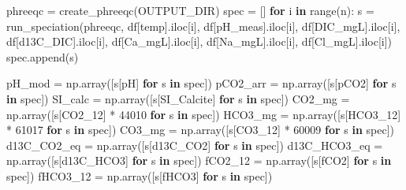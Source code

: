 \documentclass[
  letterpaper,
  DIV=11,
  numbers=noendperiod]{scrartcl}
\newenvironment{Shaded}{\begin{snugshade}}{\end{snugshade}}
\newcommand{\BuiltInTok}[1]{\textcolor[rgb]{0.00,0.23,0.31}{#1}}
\newcommand{\ControlFlowTok}[1]{\textcolor[rgb]{0.00,0.23,0.31}{\textbf{#1}}}
\newcommand{\DecValTok}[1]{\textcolor[rgb]{0.68,0.00,0.00}{#1}}
\newcommand{\KeywordTok}[1]{\textcolor[rgb]{0.00,0.23,0.31}{\textbf{#1}}}
\newcommand{\NormalTok}[1]{\textcolor[rgb]{0.00,0.23,0.31}{#1}}
\newcommand{\OperatorTok}[1]{\textcolor[rgb]{0.37,0.37,0.37}{#1}}
\newcommand{\StringTok}[1]{\textcolor[rgb]{0.13,0.47,0.30}{#1}}
\begin{document}
\begin{Shaded}
\begin{Highlighting}[]
\NormalTok{phreeqc }\OperatorTok{=}\NormalTok{ create\_phreeqc(OUTPUT\_DIR)}
\NormalTok{spec }\OperatorTok{=}\NormalTok{ []}
\ControlFlowTok{for}\NormalTok{ i }\KeywordTok{in} \BuiltInTok{range}\NormalTok{(n):}
\NormalTok{    s }\OperatorTok{=}\NormalTok{ run\_speciation(phreeqc, df[}\StringTok{\textquotesingle{}temp\textquotesingle{}}\NormalTok{].iloc[i], df[}\StringTok{\textquotesingle{}pH\_meas\textquotesingle{}}\NormalTok{].iloc[i],}
\NormalTok{                       df[}\StringTok{\textquotesingle{}DIC\_mgL\textquotesingle{}}\NormalTok{].iloc[i], df[}\StringTok{\textquotesingle{}d13C\_DIC\textquotesingle{}}\NormalTok{].iloc[i],}
\NormalTok{                       df[}\StringTok{\textquotesingle{}Ca\_mgL\textquotesingle{}}\NormalTok{].iloc[i], df[}\StringTok{\textquotesingle{}Na\_mgL\textquotesingle{}}\NormalTok{].iloc[i], df[}\StringTok{\textquotesingle{}Cl\_mgL\textquotesingle{}}\NormalTok{].iloc[i])}
\NormalTok{    spec.append(s)}

\NormalTok{pH\_mod       }\OperatorTok{=}\NormalTok{ np.array([s[}\StringTok{\textquotesingle{}pH\textquotesingle{}}\NormalTok{] }\ControlFlowTok{for}\NormalTok{ s }\KeywordTok{in}\NormalTok{ spec])}
\NormalTok{pCO2\_arr     }\OperatorTok{=}\NormalTok{ np.array([s[}\StringTok{\textquotesingle{}pCO2\textquotesingle{}}\NormalTok{] }\ControlFlowTok{for}\NormalTok{ s }\KeywordTok{in}\NormalTok{ spec])}
\NormalTok{SI\_calc      }\OperatorTok{=}\NormalTok{ np.array([s[}\StringTok{\textquotesingle{}SI\_Calcite\textquotesingle{}}\NormalTok{] }\ControlFlowTok{for}\NormalTok{ s }\KeywordTok{in}\NormalTok{ spec])}
\NormalTok{CO2\_mg       }\OperatorTok{=}\NormalTok{ np.array([s[}\StringTok{\textquotesingle{}CO2\_12\textquotesingle{}}\NormalTok{] }\OperatorTok{*} \DecValTok{44010} \ControlFlowTok{for}\NormalTok{ s }\KeywordTok{in}\NormalTok{ spec])}
\NormalTok{HCO3\_mg      }\OperatorTok{=}\NormalTok{ np.array([s[}\StringTok{\textquotesingle{}HCO3\_12\textquotesingle{}}\NormalTok{] }\OperatorTok{*} \DecValTok{61017} \ControlFlowTok{for}\NormalTok{ s }\KeywordTok{in}\NormalTok{ spec])}
\NormalTok{CO3\_mg       }\OperatorTok{=}\NormalTok{ np.array([s[}\StringTok{\textquotesingle{}CO3\_12\textquotesingle{}}\NormalTok{] }\OperatorTok{*} \DecValTok{60009} \ControlFlowTok{for}\NormalTok{ s }\KeywordTok{in}\NormalTok{ spec])}
\NormalTok{d13C\_CO2\_eq  }\OperatorTok{=}\NormalTok{ np.array([s[}\StringTok{\textquotesingle{}d13C\_CO2\textquotesingle{}}\NormalTok{] }\ControlFlowTok{for}\NormalTok{ s }\KeywordTok{in}\NormalTok{ spec])}
\NormalTok{d13C\_HCO3\_eq }\OperatorTok{=}\NormalTok{ np.array([s[}\StringTok{\textquotesingle{}d13C\_HCO3\textquotesingle{}}\NormalTok{] }\ControlFlowTok{for}\NormalTok{ s }\KeywordTok{in}\NormalTok{ spec])}
\NormalTok{fCO2\_12      }\OperatorTok{=}\NormalTok{ np.array([s[}\StringTok{\textquotesingle{}fCO2\textquotesingle{}}\NormalTok{] }\ControlFlowTok{for}\NormalTok{ s }\KeywordTok{in}\NormalTok{ spec])}
\NormalTok{fHCO3\_12     }\OperatorTok{=}\NormalTok{ np.array([s[}\StringTok{\textquotesingle{}fHCO3\textquotesingle{}}\NormalTok{] }\ControlFlowTok{for}\NormalTok{ s }\KeywordTok{in}\NormalTok{ spec])}


\end{Highlighting}
\end{Shaded}
\end{document}
